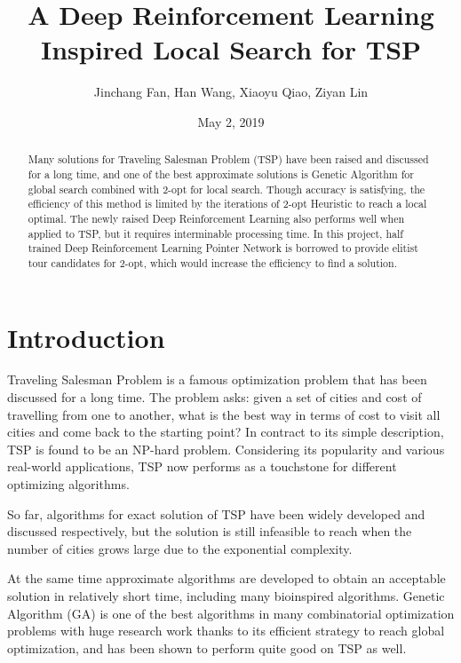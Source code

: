 \documentclass[twocolumn]{article}
\title{A Deep Reinforcement Learning 
Inspired Local Search for TSP}
\author{Jinchang Fan, Han Wang, Xiaoyu Qiao, Ziyan Lin}
\date{May 2, 2019}
\begin{document}
\maketitle

\begin{strip}
\begin{center}
\begin{abstract}
\centering\begin{minipage}{\dimexpr\paperwidth-10cm}
Many solutions for Traveling Salesman Problem (TSP) have been raised and discussed for a long time, and one of the best approximate solutions is Genetic Algorithm for global search combined with 2-opt for local search. Though accuracy is satisfying, the efficiency of this method is limited by the iterations of 2-opt Heuristic to reach a local optimal. The newly raised Deep Reinforcement Learning also performs well when applied to TSP, but it requires interminable processing time. In this project, half trained Deep Reinforcement Learning Pointer Network is borrowed to provide elitist tour candidates for 2-opt, which would increase the efficiency to find a solution.
\end{minipage}
\end{abstract}
\end{center}
\end{strip}


\section{Introduction}
Traveling Salesman Problem is a famous optimization problem that has been discussed for a long time. The problem asks: given a set of cities and cost of travelling from one to another, what is the best way in terms of cost to visit all cities and come back to the starting point? In contract to its simple description, TSP is found to be an NP-hard problem\cite{gary1979computers}. Considering its popularity and various real-world applications, TSP now performs as a touchstone for different optimizing algorithms. 

So far, algorithms for exact solution of TSP\cite{balinski1964integer}\cite{eilon1974distribution}\cite{laporte1986exact} have been widely developed and discussed respectively, but the solution is still infeasible to reach when the number of cities grows large due to the exponential complexity\cite{helsgaun2000effective}. 

At the same time approximate algorithms\cite{clarke1964scheduling}\cite{gillett1974heuristic} are developed to obtain an acceptable solution in relatively short time, including many bioinspired algorithms\cite{krasnogor2000memetic}\cite{jiao2000novel}\cite{razali2011genetic}. Genetic Algorithm (GA) \cite{whitley1994genetic}  is one of the best algorithms in many combinatorial optimization problems with huge research work thanks to its efficient strategy to reach global optimization, and has been shown to perform quite good on TSP as well\cite{merz1997genetic}. 
\end{document}
